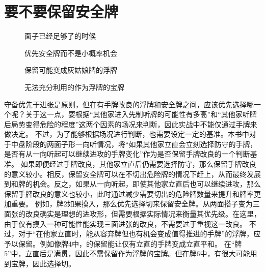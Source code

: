 \section{要不要保留安全牌}
\begin{figure}[h]
    \caption{面子已经足够了的时候}
    \label{lec8:pai1-2}
    \par\bigskip
\end{figure}
\begin{figure}[h]
    \caption{优先安全牌而不是小概率机会}
    \label{lec8:pai3}
\end{figure}
\begin{figure}[h]
    \caption{保留可能变成灰姑娘牌的浮牌}
    \label{lec8:pai4}
\end{figure}
\begin{figure}[h]
    \caption{无法充分利用的作为浮牌的宝牌}
    \label{lec8:pai5}
\end{figure}

守备优先于进张是原则，但在有手牌改良的浮牌和安全牌之间，应该优先选择哪一个呢？关于这一点，要根据“其他家进入先制听牌的可能性有多高”和“其他家听牌后局势变得危险的程度”这两个因素的场况来判断，因此实战中不能仅通过手牌来做决定。
不过，为了能够根据场况进行判断，也需要设定一定的基准。本书中对于中盘阶段的两面子形一向听情况，将“如果其他家立直会立刻选择防守的手牌，是否有从一向听起可以继续进攻的手牌变化”作为是否保留手牌改良的一个判断基准。
如果即便经过手牌改良，其他家立直后仍需要选择防守，那么保留手牌改良的意义较小。相反，保留安全牌可以在不切出危险牌的情况下赶上，从而最终发展到和牌的机会。反之，如果从一向听起，即使其他家立直后也可以继续进攻，那么保留手牌改良的意义也较小，此时通过减少需要切出的危险牌数量来提升和牌率更加重要。
例如，牌2如果摸入，那么优先选择切来保留安全牌。从两面搭子变为三面张的改良确实是理想的进攻形，但需要根据实际情况来衡量其优先级。在这里，由于仅有摸入一种可能性能实现三面进张的改良，不需要过于重视这一改良。
不过，对于“在他家立直时，能从容弃牌但也有机会变成值得推进的手牌”的浮牌，应予以保留。例如像牌4中，的保留能让仅有立直的手牌变成立直平和。
在“牌5”中，立直后是满贯，因此不需保留作为浮牌的宝牌。但在牌6中，有很大可能用到宝牌，因此选择切。

